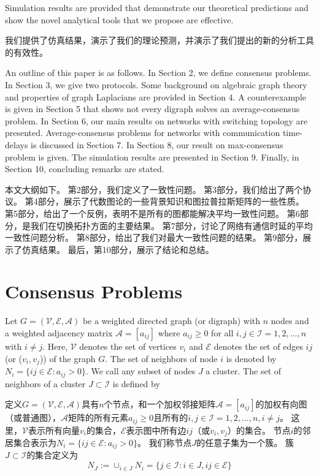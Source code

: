 \documentclass{article}
\begin{document}
{\color[gray]{0.5}
Simulation results are provided that demonstrate our theoretical predictions and show the novel analytical tools that we propose are eﬀective.
}

我们提供了仿真结果，演示了我们的理论预测，并演示了我们提出的新的分析工具的有效性。

{\color[gray]{0.5}
An outline of this paper is as follows. 
In Section 2, we deﬁne consensus problems. 
In Section 3, we give two protocols. 
Some background on algebraic graph theory and properties of graph Laplacians are provided in Section 4. 
A counterexample is given in Section 5 that shows not every digraph solves an average-consensus problem. 
In Section 6, our main results on networks with switching topology are presented. 
Average-consensus problems for networks with communication time-delays is discussed in Section 7. 
In Section 8, our result on max-consensus problem is given. 
The simulation results are presented in Section 9. 
Finally, in Section 10, concluding remarks are stated.
}

本文大纲如下。
第2部分，我们定义了一致性问题。
第3部分，我们给出了两个协议。
第4部分，展示了代数图论的一些背景知识和图拉普拉斯矩阵的一些性质。
第5部分，给出了一个反例，表明不是所有的图都能解决平均一致性问题。
第6部分，是我们在切换拓扑方面的主要结果。
第7部分，讨论了网络有通信时延的平均一致性问题分析。
第8部分，给出了我们对最大一致性问题的结果。
第9部分，展示了仿真结果。
最后，第10部分，展示了结论和总结。


\section{Consensus Problems}
{\color[gray]{0.5}
Let $G=(\mathcal{V},\mathcal{E},\mathcal{A})$ be a weighted directed graph (or digraph) with $n$ nodes and a weighted adjacency matrix $\mathcal{A}=[a_{ij}]$ where $a_{ij} \ge 0$ for all $i,j \in \mathcal{I}={1,2,…,n}$ with $i \ne j$. 
Here, $\mathcal{V}$ denotes the set of vertices $v_i$ and $\mathcal{E}$ denotes the set of edges $ij$ (or ($v_i,v_j$)) of the graph $G$. 
The set of neighbors of node $i$ is denoted by $N_i=\{ij\in \mathcal{E}:a_{ij}>0\}$. 
We call any subset of nodes $J$ a cluster. 
The set of neighbors of a cluster $J\subset \mathcal{I}$ is deﬁned by
}

\noindent 定义$G=(\mathcal{V},\mathcal{E},\mathcal{A})$具有$n$个节点，和一个加权邻接矩阵$\mathcal{A}=[a_{ij}]$的加权有向图（或普通图），$\mathcal{A}$矩阵的所有元素$a_{ij} \ge 0$且所有的$i,j \in \mathcal{I}={1,2,…,n},i \ne j$。
这里，$\mathcal{V}$表示所有向量$v_i$的集合，$\mathcal{E}$表示图中所有边$ij$（或$v_i,v_j$）的集合。
节点$i$的邻居集合表示为$N_i=\{ij\in \mathcal{E}:a_{ij}>0\}$。
我们称节点$J$的任意子集为一个簇。
簇$J\subset \mathcal{I}$的集合定义为
\begin{equation}
    N_J:=\cup_{i\in J}N_i=\{j\in \mathcal{I}:i\in J, ij\in \mathcal{E}\}
    \tag{1}
    \label{1}
\end{equation}
\end{document}
